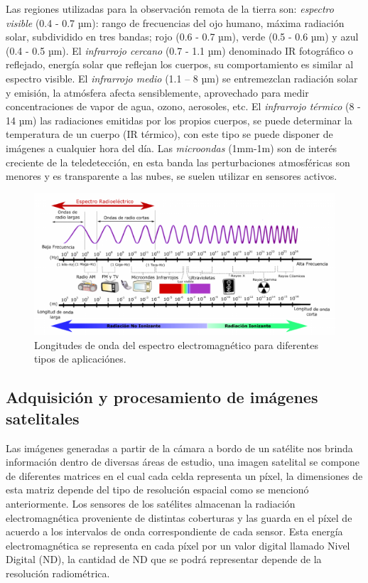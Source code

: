 Las regiones utilizadas para la observación remota de la tierra son: \textit{espectro visible} (0.4 - 0.7 µm): rango de frecuencias del ojo humano, máxima radiación solar, subdividido en tres bandas; rojo (0.6 - 0.7 µm), verde (0.5 - 0.6 µm) y azul (0.4 - 0.5 µm). El \textit{infrarrojo cercano} (0.7 - 1.1 µm) denominado IR fotográfico o reflejado, energía solar que reflejan los cuerpos, su comportamiento es similar al espectro visible. El \textit{infrarrojo medio} (1.1 – 8 µm) se entremezclan radiación solar y emisión, la atmósfera afecta sensiblemente, aprovechado para medir concentraciones de vapor de agua, ozono, aerosoles, etc. El \textit{infrarrojo térmico} (8 - 14 µm) las radiaciones emitidas por los propios cuerpos, se puede determinar la temperatura de un cuerpo (IR térmico), con este tipo se puede disponer de imágenes a cualquier hora del día. Las \textit{microondas} (1mm-1m) son de interés creciente de la teledetección, en esta banda las perturbaciones atmosféricas son menores y es transparente a las nubes, se suelen utilizar en sensores activos. 


\begin{figure}[H] \centering
  \includegraphics[scale=0.5,keepaspectratio=true,clip=true]{imagenes/MarcoTeorico/espectro-electro.png}
  \caption{Longitudes de onda del espectro electromagnético para diferentes tipos de aplicaciónes.}\label{Fig:espectro-electromagnetico}
\end{figure}



\subsection{Adquisición y procesamiento de imágenes satelitales}\label{sub:imagen_satelital}

Las imágenes generadas a partir de la cámara a bordo de un satélite nos brinda información dentro de diversas áreas de estudio, una imagen satelital se compone de diferentes matrices en el cual cada celda representa un píxel, la dimensiones de esta matriz depende del tipo de resolución espacial como se mencionó anteriormente. Los sensores de los satélites almacenan la radiación electromagnética proveniente de distintas coberturas y las guarda en el píxel de acuerdo a los intervalos de onda correspondiente de cada sensor. Esta energía electromagnética se representa en cada píxel por un valor digital llamado Nivel Digital (ND), la cantidad de ND que se podrá representar depende de la resolución radiométrica.

